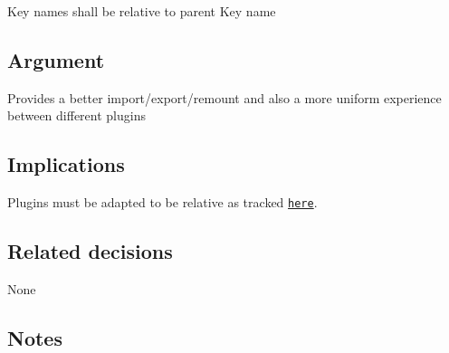 Key names shall be relative to parent Key name

\subsection*{Argument}

Provides a better import/export/remount and also a more uniform experience between different plugins

\subsection*{Implications}

Plugins must be adapted to be relative as tracked \href{https://github.com/ElektraInitiative/libelektra/issues/51}{\tt here}.

\subsection*{Related decisions}

None

\subsection*{Notes}